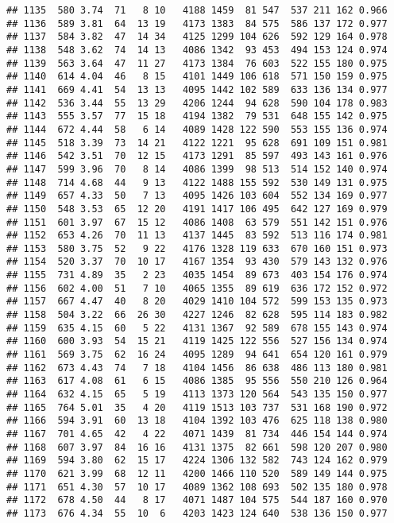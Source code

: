 \documentclass[]{article}
\begin{document}
\begin{verbatim}
## 1135  580 3.74  71   8 10   4188 1459  81 547  537 211 162 0.966
## 1136  589 3.81  64  13 19   4173 1383  84 575  586 137 172 0.977
## 1137  584 3.82  47  14 34   4125 1299 104 626  592 129 164 0.978
## 1138  548 3.62  74  14 13   4086 1342  93 453  494 153 124 0.974
## 1139  563 3.64  47  11 27   4173 1384  76 603  522 155 180 0.975
## 1140  614 4.04  46   8 15   4101 1449 106 618  571 150 159 0.975
## 1141  669 4.41  54  13 13   4095 1442 102 589  633 136 134 0.977
## 1142  536 3.44  55  13 29   4206 1244  94 628  590 104 178 0.983
## 1143  555 3.57  77  15 18   4194 1382  79 531  648 155 142 0.975
## 1144  672 4.44  58   6 14   4089 1428 122 590  553 155 136 0.974
## 1145  518 3.39  73  14 21   4122 1221  95 628  691 109 151 0.981
## 1146  542 3.51  70  12 15   4173 1291  85 597  493 143 161 0.976
## 1147  599 3.96  70   8 14   4086 1399  98 513  514 152 140 0.974
## 1148  714 4.68  44   9 13   4122 1488 155 592  530 149 131 0.975
## 1149  657 4.33  50   7 13   4095 1426 103 604  552 134 169 0.977
## 1150  548 3.53  65  12 20   4191 1417 106 495  642 127 169 0.979
## 1151  601 3.97  67  15 12   4086 1408  63 579  551 142 151 0.976
## 1152  653 4.26  70  11 13   4137 1445  83 592  513 116 174 0.981
## 1153  580 3.75  52   9 22   4176 1328 119 633  670 160 151 0.973
## 1154  520 3.37  70  10 17   4167 1354  93 430  579 143 132 0.976
## 1155  731 4.89  35   2 23   4035 1454  89 673  403 154 176 0.974
## 1156  602 4.00  51   7 10   4065 1355  89 619  636 172 152 0.972
## 1157  667 4.47  40   8 20   4029 1410 104 572  599 153 135 0.973
## 1158  504 3.22  66  26 30   4227 1246  82 628  595 114 183 0.982
## 1159  635 4.15  60   5 22   4131 1367  92 589  678 155 143 0.974
## 1160  600 3.93  54  15 21   4119 1425 122 556  527 156 134 0.974
## 1161  569 3.75  62  16 24   4095 1289  94 641  654 120 161 0.979
## 1162  673 4.43  74   7 18   4104 1456  86 638  486 113 180 0.981
## 1163  617 4.08  61   6 15   4086 1385  95 556  550 210 126 0.964
## 1164  632 4.15  65   5 19   4113 1373 120 564  543 135 150 0.977
## 1165  764 5.01  35   4 20   4119 1513 103 737  531 168 190 0.972
## 1166  594 3.91  60  13 18   4104 1392 103 476  625 118 138 0.980
## 1167  701 4.65  42   4 22   4071 1439  81 734  446 154 144 0.974
## 1168  607 3.97  84  16 16   4131 1375  82 661  598 120 207 0.980
## 1169  594 3.80  62  15 17   4224 1306 132 582  743 124 162 0.979
## 1170  621 3.99  68  12 11   4200 1466 110 520  589 149 144 0.975
## 1171  651 4.30  57  10 17   4089 1362 108 693  502 135 180 0.978
## 1172  678 4.50  44   8 17   4071 1487 104 575  544 187 160 0.970
## 1173  676 4.34  55  10  6   4203 1423 124 640  538 136 150 0.977

\end{verbatim}
\end{document}
